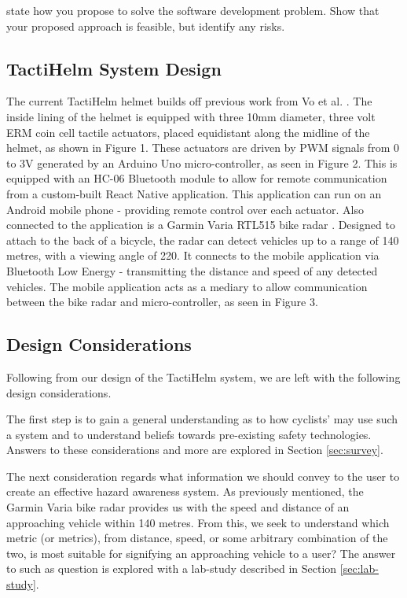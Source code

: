\documentclass{interim}
\begin{document}
state how you propose to solve the software development problem. Show that your proposed approach is feasible, but identify any risks.

\subsection{TactiHelm System Design}
The current TactiHelm helmet builds off previous work from Vo et al. \cite{10.1145/3411763.3451580}. The inside lining of the helmet is equipped with three 10mm diameter, three volt ERM coin cell tactile actuators, placed equidistant along the midline of the helmet, as shown in Figure 1. These actuators are driven by PWM signals from 0 to 3V generated by an Arduino Uno micro-controller, as seen in Figure 2. This is equipped with an HC-06 Bluetooth module to allow for remote communication from a custom-built React Native application. This application can run on an Android mobile phone - providing remote control over each actuator. Also connected to the application is a Garmin Varia RTL515 bike radar \cite{garminradar}. Designed to attach to the back of a bicycle, the radar can detect vehicles up to a range of 140 metres, with a viewing angle of 220\degree{}. It connects to the mobile application via Bluetooth Low Energy - transmitting the distance and speed of any detected vehicles. The mobile application acts as a mediary to allow communication between the bike radar and micro-controller, as seen in Figure 3.

\subsection{Design Considerations}
Following from our design of the TactiHelm system, we are left with the following design considerations.

The first step is to gain a general understanding as to how cyclists' may use such a system and to understand beliefs towards pre-existing safety technologies. Answers to these considerations and more are explored in Section \ref{sec:survey}.

The next consideration regards what information we should convey to the user to create an effective hazard awareness system. As previously mentioned, the Garmin Varia bike radar provides us with the speed and distance of an approaching vehicle within 140 metres. From this, we seek to understand which metric (or metrics), from distance, speed, or some arbitrary combination of the two, is most suitable for signifying an approaching vehicle to a user? The answer to such as question is explored with a lab-study described in Section \ref{sec:lab-study}.
\end{document}
